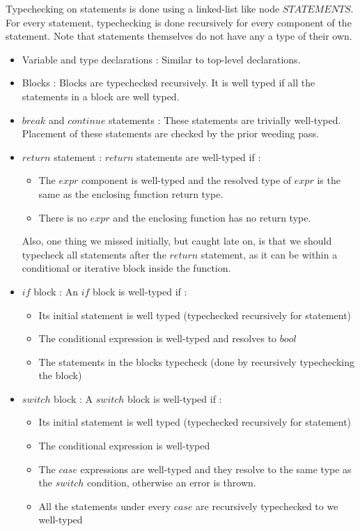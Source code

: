 \documentclass[preprint,12pt]{elsarticle}
\begin{document}
Typechecking on statements is done using a linked-list like node $STATEMENTS$. For every statement, typechecking is done recursively for every component of the statement. Note that statements themselves do not have any a type of their own. 
\begin{itemize}
\item Variable and type declarations : Similar to top-level declarations.
\item Blocks : Blocks are typechecked recursively. It is well typed if all the statements in a block are well typed.
\item $break$ and $continue$ statements : These statements are trivially well-typed. Placement of these statements are checked by the prior weeding pass.
\item $return$ statement : $return$ statements are well-typed if : 
\begin{itemize}
\item The $expr$ component is well-typed and the resolved type of $expr$ is the same as the enclosing function return type.
\item There is no $expr$ and the enclosing function has no return type.
\end{itemize}
Also, one thing we missed initially, but caught late on, is that we should typecheck all statements after the $return$ statement, as it can be within a conditional or iterative block inside the function.
\item $if$ block : An $if$ block is well-typed if :
\begin{itemize}
\item Its initial statement is well typed (typechecked recursively for statement)
\item The conditional expression is well-typed and resolves to $bool$
\item The statements in the blocks typecheck (done by recursively typechecking the block)
\end{itemize}
\item $switch$ block : A $switch$ block is well-typed if :
\begin{itemize}
\item Its initial statement is well typed (typechecked recursively for statement)
\item The conditional expression is well-typed
\item The $case$ expressions are well-typed and they resolve to the same type as the $switch$ condition, otherwise an error is thrown.
\item All the statements under every $case$ are recursively typechecked to we well-typed

\end{itemize}
\end{itemize}
\end{document}
